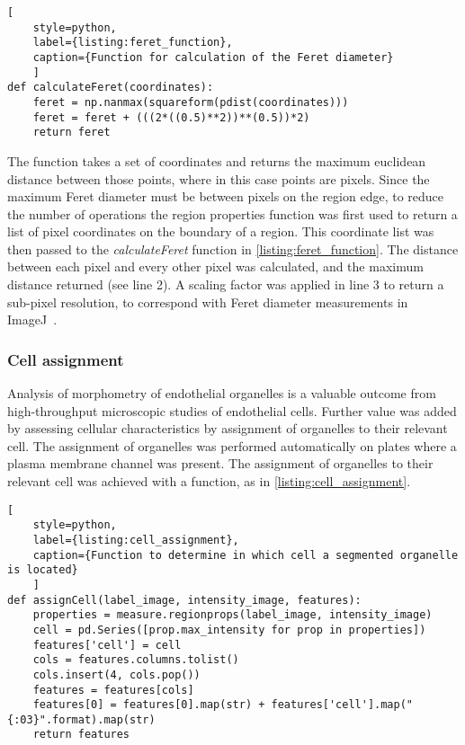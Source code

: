 \begin{lstlisting}[
	style=python,
	label={listing:feret_function},
	caption={Function for calculation of the Feret diameter}
	]
def calculateFeret(coordinates):
    feret = np.nanmax(squareform(pdist(coordinates)))
    feret = feret + (((2*((0.5)**2))**(0.5))*2)
    return feret
\end{lstlisting}

The function takes a set of coordinates and returns the maximum euclidean distance between those points, where in this case points are pixels. Since the maximum Feret diameter must be between pixels on the region edge, to reduce the number of operations the region properties function was first used to return a list of pixel coordinates on the boundary of a region. This coordinate list was then passed to the \emph{calculateFeret} function in \autoref{listing:feret_function}. The distance between each pixel and every other pixel was calculated, and the maximum distance returned (see line 2). A scaling factor was applied in line 3 to return a sub-pixel resolution, to correspond with Feret diameter measurements in ImageJ~\cite{ImageJ2003}.

\subsubsection{Cell assignment}
\label{endothelial_morphometry:image_processing:cell_assignment}
Analysis of morphometry of endothelial organelles is a valuable outcome from high-throughput microscopic studies of endothelial cells. Further value was added by assessing cellular characteristics by assignment of organelles to their relevant cell. The assignment of organelles was performed automatically on plates where a plasma membrane channel was present. The assignment of organelles to their relevant cell was achieved with a function, as in \autoref{listing:cell_assignment}.

\begin{lstlisting}[
	style=python,
	label={listing:cell_assignment},
	caption={Function to determine in which cell a segmented organelle is located}
	]
def assignCell(label_image, intensity_image, features):
    properties = measure.regionprops(label_image, intensity_image)
    cell = pd.Series([prop.max_intensity for prop in properties])
    features['cell'] = cell
    cols = features.columns.tolist()
    cols.insert(4, cols.pop())
    features = features[cols]
    features[0] = features[0].map(str) + features['cell'].map("{:03}".format).map(str)
    return features
\end{lstlisting}

